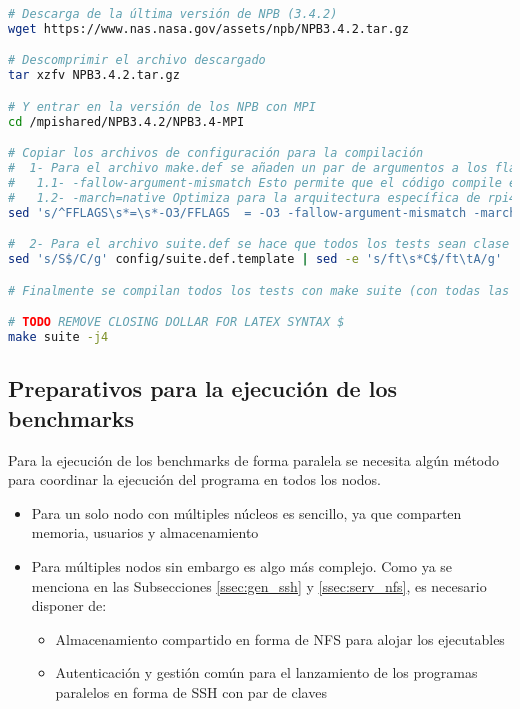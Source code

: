 \begin{lstlisting}[language=bash]
# Descarga de la última versión de NPB (3.4.2)
wget https://www.nas.nasa.gov/assets/npb/NPB3.4.2.tar.gz

# Descomprimir el archivo descargado
tar xzfv NPB3.4.2.tar.gz

# Y entrar en la versión de los NPB con MPI
cd /mpishared/NPB3.4.2/NPB3.4-MPI

# Copiar los archivos de configuración para la compilación
#  1- Para el archivo make.def se añaden un par de argumentos a los flags de compilación:
#   1.1- -fallow-argument-mismatch Esto permite que el código compile en las últimas versiones de gfortran
#   1.2- -march=native Optimiza para la arquitectura específica de rpi4
sed 's/^FFLAGS\s*=\s*-O3/FFLAGS  = -O3 -fallow-argument-mismatch -march=native/g' config/make.def.template | sed -e 's/^CFLAGS\s*=\s*-O3/CFLAGS  = -O3 -march=native/g' > config/make.def

#  2- Para el archivo suite.def se hace que todos los tests sean clase C menos FT, que por razones de memoria es clase A, y MG clase B, por los mismos motivos.
sed 's/S$/C/g' config/suite.def.template | sed -e 's/ft\s*C$/ft\tA/g' | sed -e 's/mg\s*C$/mg\tB/g' > config/suite.def

# Finalmente se compilan todos los tests con make suite (con todas las CPU en paralelo)

# TODO REMOVE CLOSING DOLLAR FOR LATEX SYNTAX $
make suite -j4
\end{lstlisting}

\subsection{Preparativos para la ejecución de los benchmarks}
Para la ejecución de los benchmarks de forma paralela se necesita algún método para coordinar la ejecución del programa en todos los nodos.

\begin{itemize}
    \item Para un solo nodo con múltiples núcleos es sencillo, ya que comparten memoria, usuarios y almacenamiento
    \item Para múltiples nodos sin embargo es algo más complejo. Como ya se menciona en las Subsecciones \ref{ssec:gen_ssh} y \ref{ssec:serv_nfs}, es necesario disponer de:
    \begin{itemize}
        \item Almacenamiento compartido en forma de NFS para alojar los ejecutables
        \item Autenticación y gestión común para el lanzamiento de los programas paralelos en forma de SSH con par de claves
    \end{itemize}
\end{itemize}

